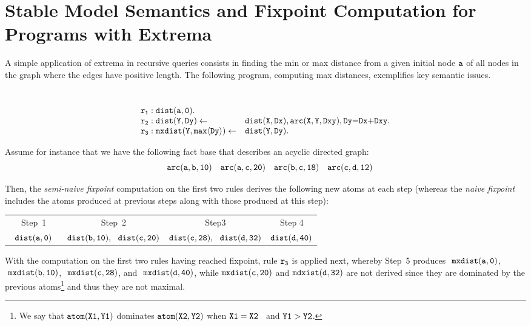 \documentclass[11pt]{article}
\def\mt{\tt}
\newcommand{\bldl}{\smallskip\[\begin{array}{ll}}
\newcommand{\eldl}{\end{array}\]\rm}
\newcommand{\prule}[2]{ \mt #1 \leftarrow & \mt #2 \\}
\newcommand{\pfact}[2]{ \mt  #1 &  \mt #2 \\}
\def\inv{\vspace{-0.2cm}}
\def\sinv{\vspace{-0.1cm}}
\def\inv{\vspace{-0.2cm}}
\def\sinv{\vspace{-0.1cm}}
\begin{document}
\section{{\large \bf Stable Model Semantics and Fixpoint Computation for Programs with Extrema}} \label{ex:stratified}

A  simple application of extrema in recursive queries consists in finding the min or max distance
from a given initial node $\tt a$ of all  nodes in the graph where the edges have positive length.
The following program, computing max distances,  exemplifies  key semantic issues.

\sinv \begin{example} ~\\[-0.4cm]
 \bldl
 \pfact{r_1: dist(a, 0).}{ }
   \prule{r_2: dist(Y,  Dy)}{dist(X, Dx), arc(X, Y,  Dxy),  Dy{=}Dx{+}Dxy.}
    \prule{r_3: mxdist(Y,   max \langle Dy \rangle)}{dist(Y, Dy).}
   \eldl
 \end{example}
 
\sinv Assume for instance that we have the following fact base that describes an acyclic directed graph: 
 \inv $$\tt ~~~ arc(a, b, 10) ~~~arc(a, c,  20)  ~~~arc(b, c, 18)  ~~~arc(c, d, 12)$$

\sinv Then, the {\it semi-naive fixpoint} computation on the first two rules derives the following new atoms at each step
(whereas the {\it naive fixpoint} includes the atoms produced at previous steps along with those produced at this step):\\

\sinv\inv\begin{center}

\begin{tabular}{|c  |c | c | c |}
\hline
  Step~1 & Step~2  &  Step3 &  Step 4 \\
$\tt ~~dist(a, 0)~~$ & $\tt dist(b, 10), ~~dist(c, 20) $ &$\tt  dist(c, 28), ~~dist(d, 32)$ & $\tt  dist(d, 40)$\\
\hline
\end{tabular}
\end{center}

 \noindent With the computation on the first two rules having reached fixpoint, rule $\tt r_3$ is applied next, whereby  Step~5
 produces $\tt ~mxdist(a, 0)$,  $\tt ~mxdist(b, 10)$,   $\tt ~mxdist(c, 28) $,  and $\tt  ~mxdist(d, 40)$,  while 
$\tt mxdist(c, 20)$ and $\tt mdxist(d, 32)$ are not derived since they are dominated  by 
the previous atoms\footnote{We say that $\tt atom(X1, Y1)$ dominates $\tt atom(X2, Y2)$ when
 $\tt X1=X2$~ and  $\tt Y1 >Y2$.} and thus  they are not maximal.
 
\end{document}
